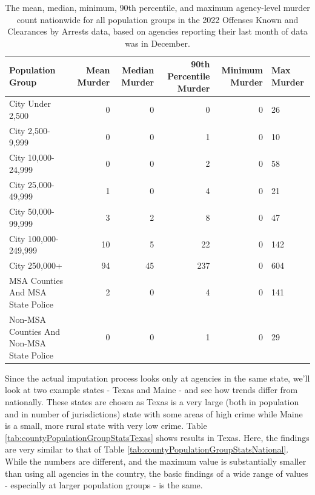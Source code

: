 \documentclass[
  12pt,
  openany]{book}
\begin{document}
\begin{longtable}[t]{lrrrrl}
\caption{\label{tab:countyPopulationGroupStats}The mean, median, minimum, 90th percentile, and maximum agency-level murder count nationwide for all population groups in the 2022 Offenses Known and Clearances by Arrests data, based on agencies reporting their last month of data was in December.}\\
\toprule
Population Group & Mean Murder & Median Murder & 90th Percentile Murder & Minimum Murder & Max Murder\\
\midrule
City Under 2,500 & 0 & 0 & 0 & 0 & 26\\
City 2,500-9,999 & 0 & 0 & 1 & 0 & 10\\
City 10,000-24,999 & 0 & 0 & 2 & 0 & 58\\
City 25,000-49,999 & 1 & 0 & 4 & 0 & 21\\
City 50,000-99,999 & 3 & 2 & 8 & 0 & 47\\
\addlinespace
City 100,000-249,999 & 10 & 5 & 22 & 0 & 142\\
City 250,000+ & 94 & 45 & 237 & 0 & 604\\
MSA Counties And MSA State Police & 2 & 0 & 4 & 0 & 141\\
Non-MSA Counties And Non-MSA State Police & 0 & 0 & 1 & 0 & 29\\
\bottomrule
\end{longtable}

Since the actual imputation process looks only at agencies in the same state, we'll look at two example states - Texas and Maine - and see how trends differ from nationally. These states are chosen as Texas is a very large (both in population and in number of jurisdictions) state with some areas of high crime while Maine is a small, more rural state with very low crime. Table \ref{tab:countyPopulationGroupStatsTexas} shows results in Texas. Here, the findings are very similar to that of Table \ref{tab:countyPopulationGroupStatsNational}. While the numbers are different, and the maximum value is substantially smaller than using all agencies in the country, the basic findings of a wide range of values - especially at larger population groups - is the same.
\end{document}
